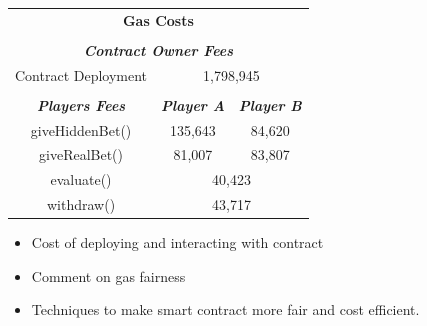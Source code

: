 \documentclass[12pt,a4paper]{article}
\begin{document}
\begin{table}[htpb]
    \begin{center}
        \begin{tabular}{ccc}
        \multicolumn{3}{c}{\textbf{Gas Costs}}                                                                                                                   \\
        \multicolumn{1}{l}{}                                 & \multicolumn{1}{l}{}                            & \multicolumn{1}{l}{}                            \\ \hline
        \multicolumn{3}{|c|}{\textit{\textbf{Contract Owner Fees}}}                                                                                              \\ \hline
        \multicolumn{1}{|c|}{Contract Deployment}            & \multicolumn{2}{c|}{1,798,945}                                                                    \\ \hline
        \multicolumn{1}{l}{}                                 & \multicolumn{1}{l}{}                            & \multicolumn{1}{l}{}                            \\ \hline
        \multicolumn{1}{|c|}{\textit{\textbf{Players Fees}}} & \multicolumn{1}{c|}{\textit{\textbf{Player A}}} & \multicolumn{1}{c|}{\textit{\textbf{Player B}}} \\ \hline
        \multicolumn{1}{|c|}{giveHiddenBet()}                & \multicolumn{1}{c|}{135,643}                    & \multicolumn{1}{c|}{84,620}                     \\ \hline
        \multicolumn{1}{|c|}{giveRealBet()}                  & \multicolumn{1}{c|}{81,007}                     & \multicolumn{1}{c|}{83,807}                     \\ \hline
        \multicolumn{1}{|c|}{evaluate()}                     & \multicolumn{2}{c|}{40,423}                                                                       \\ \hline
        \multicolumn{1}{|c|}{withdraw()}                     & \multicolumn{2}{c|}{43,717}                                                                       \\ \hline
        \end{tabular}
    \end{center}
\end{table}



\begin{itemize}
        \item Cost of deploying and interacting with contract
        \item Comment on gas fairness
        \item Techniques to make smart contract more fair and cost efficient.
\end{itemize}
\end{document}
